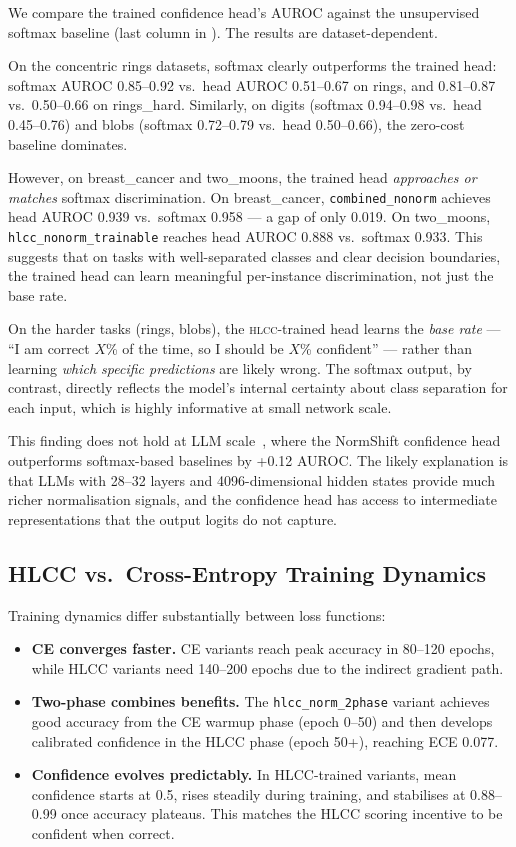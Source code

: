 \documentclass[11pt,a4paper]{article}
\newcommand{\hlcc}{\textsc{hlcc}}
\begin{document}
We compare the trained confidence head's AUROC against the unsupervised
softmax baseline (last column in ).  The results are
dataset-dependent.

On the concentric rings datasets, softmax clearly outperforms the
trained head: softmax AUROC 0.85--0.92 vs.\ head AUROC 0.51--0.67
on rings, and 0.81--0.87 vs.\ 0.50--0.66 on rings\_hard.  Similarly,
on digits (softmax 0.94--0.98 vs.\ head 0.45--0.76) and blobs
(softmax 0.72--0.79 vs.\ head 0.50--0.66), the zero-cost baseline
dominates.

However, on breast\_cancer and two\_moons, the trained head
\emph{approaches or matches} softmax discrimination.  On breast\_cancer,
\texttt{combined\_nonorm} achieves head AUROC 0.939 vs.\ softmax 0.958
--- a gap of only 0.019.  On two\_moons, \texttt{hlcc\_nonorm\_trainable}
reaches head AUROC 0.888 vs.\ softmax 0.933.  This suggests that on
tasks with well-separated classes and clear decision boundaries, the
trained head can learn meaningful per-instance discrimination, not just
the base rate.

On the harder tasks (rings, blobs), the \hlcc{}-trained head learns
the \emph{base rate} --- ``I am correct $X$\% of the time, so I should
be $X$\% confident'' --- rather than learning \emph{which specific
predictions} are likely wrong.  The softmax output, by contrast,
directly reflects the model's internal certainty about class separation
for each input, which is highly informative at small network scale.

This finding does not hold at LLM scale~\cite{mccallum2026hlcc},
where the NormShift confidence head outperforms softmax-based baselines
by +0.12 AUROC.  The likely explanation is that LLMs with 28--32
layers and 4096-dimensional hidden states provide much richer
normalisation signals, and the confidence head has access to
intermediate representations that the output logits do not capture.

\subsection{HLCC vs.\ Cross-Entropy Training Dynamics}

Training dynamics differ substantially between loss functions:
\begin{itemize}
  \item \textbf{CE converges faster.}  CE variants reach peak accuracy
        in 80--120 epochs, while HLCC variants need 140--200 epochs due
        to the indirect gradient path.
  \item \textbf{Two-phase combines benefits.}  The
        \texttt{hlcc\_norm\_2phase} variant achieves good accuracy from
        the CE warmup phase (epoch 0--50) and then develops calibrated
        confidence in the HLCC phase (epoch 50+), reaching ECE 0.077.
  \item \textbf{Confidence evolves predictably.}  In HLCC-trained
        variants, mean confidence starts at 0.5, rises steadily during
        training, and stabilises at 0.88--0.99 once accuracy plateaus.
        This matches the HLCC scoring incentive to be confident when
        correct.
\end{itemize}
\end{document}
